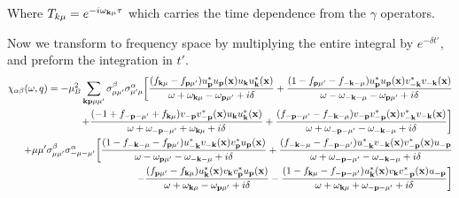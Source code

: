 \documentclass[prb,showpacs,amssymb,amsmath,twocolumn]{revtex4-1}
\begin{document}
\begin{widetext}
Where $T_{k\mu}=e^{-i\omega_{{\bf k}\mu}\tau}$ which carries the time dependence from the $\gamma$ operators. 


Now we transform to frequency space by multiplying the entire integral by $e^{- \delta t'}$, and preform the integration in $t'$.
\begin{align*}
\chi_{\alpha\beta}(\omega,q) = -\mu_B^2 \sum\limits_{{\bf k}{\bf p}\mu\mu'} \sigma^\beta_{\mu\mu'}\sigma^\alpha_{\mu'\mu}\bigg[\frac{(f_{{\bf k}\mu}-f_{{\bf p}\mu'})u^*_{\bf p} u_{\bf p}({\bf x})u_{\bf k} u^*_{\bf k}({\bf x})}{\omega+\omega_{{\bf k}\mu}-\omega_{{\bf p}\mu'}+i\delta}
+\frac{(1-f_{{\bf p}\mu'}-f_{-{\bf k}-\mu})u^*_{\bf p} u_{\bf p}({\bf x})v^*_{-{\bf k}}v_{-{\bf k}}({\bf x})}{\omega-\omega_{-{\bf k}-\mu}-\omega_{{\bf p}\mu'}+i\delta}\\
+\frac{(-1+f_{-{\bf p}-\mu'}+f_{{\bf k}\mu})v_{-{\bf p}}v^*_{-{\bf p}}({\bf x})u_{\bf k} u^*_{\bf k}({\bf x})}{\omega+\omega_{-{\bf p}-\mu'}+\omega_{{\bf k}\mu}+i\delta}
+\frac{(f_{-{\bf p}-\mu'}-f_{-{\bf k}-\mu})v_{-{\bf p}}v^*_{-{\bf p}}({\bf x})v^*_{-{\bf k}}v_{-{\bf k}}({\bf x})}{\omega+\omega_{-{\bf p}-\mu'}-\omega_{-{\bf k}-\mu}+i\delta}\bigg] 
\\
+\mu\mu' \sigma^\beta_{\mu\mu'}\sigma^\alpha_{-\mu-\mu'}\bigg[\frac{(1-f_{-{\bf k}-\mu}-f_{{\bf p}\mu'})u^*_{-{\bf k}}v_{-{\bf k}}({\bf x})v^*_{\bf p} u_{\bf p}({\bf x})}{\omega-\omega_{{\bf p}\mu'} - \omega_{-{\bf k}-\mu}+i\delta}
+\frac{(f_{-{\bf k}-\mu}-f_{-{\bf p}-\mu'})u^*_{-{\bf k}}v_{-{\bf k}}({\bf x})v^*_{-{\bf p}}({\bf x})u_{-{\bf p}}}{\omega+\omega_{-{\bf p}-\mu'}-\omega_{-{\bf k}-\mu}+i\delta} \\
-\frac{(f_{{\bf p}\mu'}-f_{{\bf k}\mu})u^*_{\bf k}({\bf x})v_{\bf k} v^*_{\bf p} u_{\bf p}({\bf x})}{\omega+\omega_{{\bf k}\mu}-\omega_{{\bf p}\mu'}+i\delta}
-\frac{(1-f_{{\bf k}\mu}-f_{-{\bf p}-\mu'})u^*_{\bf k}({\bf x})v_{\bf k} v^*_{-{\bf p}}({\bf x})u_{-{\bf p}}}{\omega+\omega_{{\bf k}\mu}+\omega_{-{\bf p}-\mu'}+i\delta}\bigg]
\end{align*}


\end{widetext}
\end{document}
